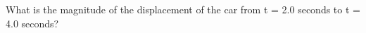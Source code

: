 \documentclass[10pt]{examdesign}
\begin{document}
\begin{multiplechoice} [title={Multiple Choice},
	rearrange=no]
\begin{question}
What is the magnitude of the displacement of the car from t = 2.0 seconds to t = 4.0 seconds?
	\end{question}

%
%
%
%
%
%


\end{multiplechoice}
\end{document}
